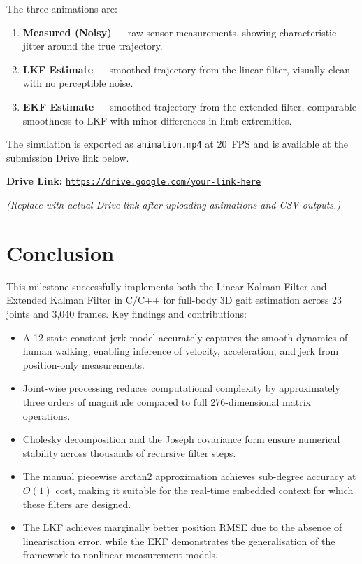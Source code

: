 \documentclass[12pt,a4paper]{article}
\begin{document}
The three animations are:
\begin{enumerate}[noitemsep]
    \item \textbf{Measured (Noisy)} — raw sensor measurements, showing characteristic
          jitter around the true trajectory.
    \item \textbf{LKF Estimate} — smoothed trajectory from the linear filter,
          visually clean with no perceptible noise.
    \item \textbf{EKF Estimate} — smoothed trajectory from the extended filter,
          comparable smoothness to LKF with minor differences in limb extremities.
\end{enumerate}

The simulation is exported as \texttt{animation.mp4} at 20~FPS and is available
at the submission Drive link below.

\bigskip
\noindent\textbf{Drive Link:} \href{https://drive.google.com/your-link-here}
{\texttt{https://drive.google.com/your-link-here}}
\smallskip

\noindent\textit{(Replace with actual Drive link after uploading animations and CSV outputs.)}

\section{Conclusion}

This milestone successfully implements both the Linear Kalman Filter and Extended
Kalman Filter in C/C++ for full-body 3D gait estimation across 23 joints and
3{,}040 frames. Key findings and contributions:

\begin{itemize}[noitemsep]
    \item A 12-state constant-jerk model accurately captures the smooth dynamics
          of human walking, enabling inference of velocity, acceleration, and jerk
          from position-only measurements.
    \item Joint-wise processing reduces computational complexity by approximately
          three orders of magnitude compared to full 276-dimensional matrix operations.
    \item Cholesky decomposition and the Joseph covariance form ensure numerical
          stability across thousands of recursive filter steps.
    \item The manual piecewise arctan2 approximation achieves sub-degree accuracy
          at $O(1)$ cost, making it suitable for the real-time embedded context for
          which these filters are designed.
    \item The LKF achieves marginally better position RMSE due to the absence of
          linearisation error, while the EKF demonstrates the generalisation of
          the framework to nonlinear measurement models.
\end{itemize}
\end{document}
